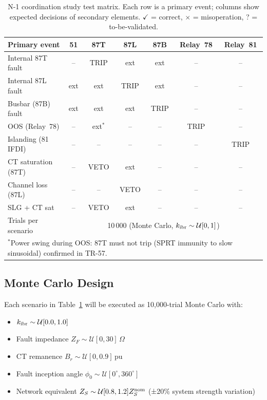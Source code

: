 \begin{table}[ht]
  \centering
  \caption{N-1 coordination study test matrix.  Each row is a primary
  event; columns show expected decisions of secondary elements.
  $\checkmark$ = correct, $\times$ = misoperation, ? = to-be-validated.}
  \label{tab:ch7_n1}
  \small
  \begin{tabular}{lcccccc}
    \toprule
    Primary event & 51 & 87T & 87L & 87B & Relay~78 & Relay~81 \\
    \midrule
    Internal 87T fault & -- & TRIP & ext & ext & -- & -- \\
    Internal 87L fault & ext & ext & TRIP & ext & -- & -- \\
    Busbar (87B) fault & ext & ext & ext & TRIP & -- & -- \\
    OOS (Relay~78)     & -- & ext$^*$ & -- & -- & TRIP & -- \\
    Islanding (81 IFDI)& -- & -- & -- & -- & -- & TRIP \\
    CT saturation (87T)& -- & VETO & ext & -- & -- & -- \\
    Channel loss (87L) & -- & -- & VETO & -- & -- & -- \\
    SLG + CT sat       & -- & VETO & ext & -- & -- & -- \\
    \midrule
    Trials per scenario & \multicolumn{6}{c}{10\,000 (Monte Carlo, $k_{\rm ibr} \sim \mathcal{U}[0,1]$)} \\
    \bottomrule
    \multicolumn{7}{l}{\scriptsize $^*$Power swing during OOS: 87T must not trip (SPRT immunity to slow sinusoidal) confirmed in TR-57.}
  \end{tabular}
\end{table}

\subsection{Monte Carlo Design}

Each scenario in Table~\ref{tab:ch7_n1} will be executed as 10,000-trial
Monte Carlo with:
\begin{itemize}
  \item $k_{\rm ibr} \sim \mathcal{U}[0.0, 1.0]$
  \item Fault impedance $Z_F \sim \mathcal{U}[0, 30]\,\Omega$
  \item CT remanence $B_r \sim \mathcal{U}[0, 0.9]\,\text{pu}$
  \item Fault inception angle $\phi_0 \sim \mathcal{U}[0^\circ, 360^\circ]$
  \item Network equivalent $Z_S \sim \mathcal{U}[0.8, 1.2] Z_S^{\rm nom}$
    (±20\% system strength variation)
\end{itemize}

